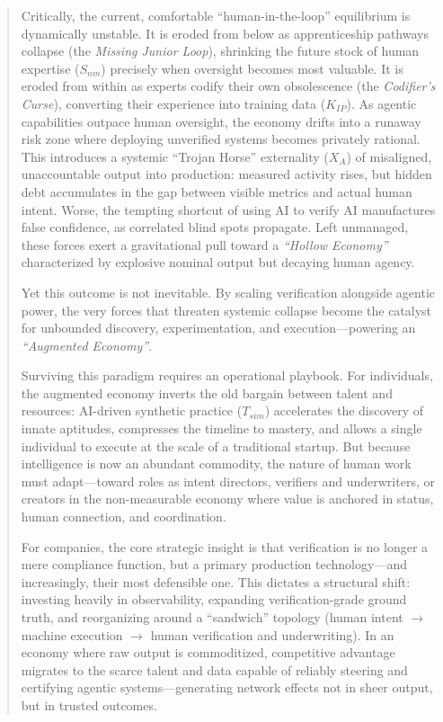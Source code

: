 \documentclass[12pt, letter]{article}
\begin{document}
\begin{abstract}
Critically, the current, comfortable ``human-in-the-loop'' equilibrium is dynamically unstable. It is eroded from below as apprenticeship pathways collapse (the \emph{Missing Junior Loop}), shrinking the future stock of human expertise ($S_{nm}$) precisely when oversight becomes most valuable. It is eroded from within as experts codify their own obsolescence (the \emph{Codifier's Curse}), converting their experience into training data ($K_{IP}$). As agentic capabilities outpace human oversight, the economy drifts into a runaway risk zone where deploying unverified systems becomes privately rational. This introduces a systemic ``Trojan Horse'' externality ($X_A$) of misaligned, unaccountable output into production: measured activity rises, but hidden debt accumulates in the gap between visible metrics and actual human intent. Worse, the tempting shortcut of using AI to verify AI manufactures false confidence, as correlated blind spots propagate. Left unmanaged, these forces exert a gravitational pull toward a \emph{``Hollow Economy''} characterized by explosive nominal output but decaying human agency.

Yet this outcome is not inevitable. By scaling verification alongside agentic power, the very forces that threaten systemic collapse become the catalyst for unbounded discovery, experimentation, and execution---powering an \emph{``Augmented Economy''}.

Surviving this paradigm requires an operational playbook. For individuals, the augmented economy inverts the old bargain between talent and resources: AI-driven synthetic practice ($T_{sim}$) accelerates the discovery of innate aptitudes, compresses the timeline to mastery, and allows a single individual to execute at the scale of a traditional startup. But because intelligence is now an abundant commodity, the nature of human work must adapt---toward roles as intent directors, verifiers and underwriters, or creators in the non-measurable economy where value is anchored in status, human connection, and coordination.

For companies, the core strategic insight is that verification is no longer a mere compliance function, but a primary production technology—and increasingly, their most defensible one. This dictates a structural shift: investing heavily in observability, expanding verification-grade ground truth, and reorganizing around a ``sandwich'' topology (human intent $\rightarrow$ machine execution $\rightarrow$ human verification and underwriting). In an economy where raw output is commoditized, competitive advantage migrates to the scarce talent and data capable of reliably steering and certifying agentic systems—generating network effects not in sheer output, but in trusted outcomes.


\end{abstract}
\end{document}
